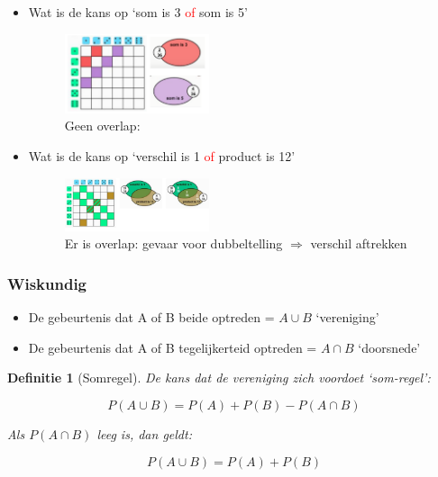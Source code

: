 \documentclass{article}
\newtheorem{theorem}{Definitie}[section]
\begin{document}
\begin{itemize}
    \item Wat is de kans op `som is 3 \textcolor{red}{of} som is 5'
    \begin{figure}[H]
        \centering
        \includegraphics[width=0.4\textwidth]{somregel.png}
        \caption{Geen overlap: }
    \end{figure}
    
    \item Wat is de kans op `verschil is 1 \textcolor{red}{of} product is 12'
    \begin{figure}[H]
        \centering
        \includegraphics[width=0.4\textwidth]{somregel2.png}
        \caption{Er is overlap: gevaar voor dubbeltelling $\Rightarrow$ verschil aftrekken}
    \end{figure}
\end{itemize}

\subsubsection{Wiskundig}

\begin{itemize}
    \item De gebeurtenis dat A of B beide optreden = $A \cup B$ `vereniging'
    \item De gebeurtenis dat A of B tegelijkerteid optreden = $A \cap B$ `doorsnede'
\end{itemize}

\begin{theorem}[Somregel]
De kans dat de vereniging zich voordoet `som-regel':

\begin{equation}
    P(A \cup B) = P(A) + P(B) - P(A \cap B)
\end{equation}

Als $P(A \cap B)$ leeg is, dan geldt:

\begin{equation}
    P(A \cup B) = P(A) + P(B)
\end{equation}
\end{theorem}
\end{document}
